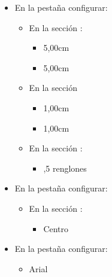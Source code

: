 \documentclass[letterpaper,10pt,spanish]{sphinxmanual}
\begin{document}
\begin{enumerate}
\begin{itemize}
\item {} 
\sphinxAtStartPar
En la pestaña  configurar:
\begin{itemize}
\item {} 
\sphinxAtStartPar
En la sección :
\begin{itemize}
\item {} 
\sphinxAtStartPar
{} 5,00cm

\item {} 
\sphinxAtStartPar
{} 5,00cm

\end{itemize}

\item {} 
\sphinxAtStartPar
En la sección 
\begin{itemize}
\item {} 
\sphinxAtStartPar
{} 1,00cm

\item {} 
\sphinxAtStartPar
{} 1,00cm

\end{itemize}

\item {} 
\sphinxAtStartPar
En la sección :
\begin{itemize}
\item {} 
,5 renglones

\end{itemize}

\end{itemize}

\item {} 
\sphinxAtStartPar
En la pestaña  configurar:
\begin{itemize}
\item {} 
\sphinxAtStartPar
En la sección :
\begin{itemize}
\item {} 
\sphinxAtStartPar
Centro

\end{itemize}

\end{itemize}

\item {} 
\sphinxAtStartPar
En la pestaña  configurar:
\begin{itemize}
\item {} 
\sphinxAtStartPar
{} Arial


\end{itemize}
\end{itemize}
\end{enumerate}
\end{document}
